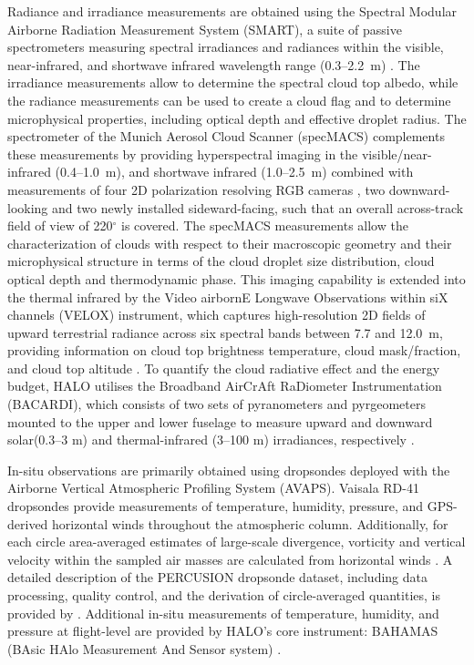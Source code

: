 \documentclass{article}
\begin{document}
Radiance and irradiance measurements are obtained using the Spectral Modular Airborne Radiation Measurement System (SMART), a suite of passive spectrometers measuring spectral irradiances and radiances within the visible, near-infrared, and shortwave infrared wavelength range (0.3--2.2~\textmu m) \citep{wendischAirborneSpectralAlbedometer2001, wendischACRIDICONCHUVACampaign2016}. The irradiance measurements allow to determine the spectral cloud top albedo, while the radiance measurements can be used to create a cloud flag and to determine microphysical properties, including optical depth and effective droplet radius. 
The spectrometer of the Munich Aerosol Cloud Scanner (specMACS) complements these measurements by providing hyperspectral imaging in the visible/near-infrared (0.4--1.0~\textmu m), and shortwave infrared (1.0--2.5~\textmu m) \citep{ewaldDesignCharacterizationSpecMACS2016} combined with measurements of four 2D polarization resolving RGB cameras \citep{Weber2024specMACSPolarization}, two downward-looking and two newly installed sideward-facing, such that an overall across-track field of view of 220$^{\circ}$ is covered.
The specMACS measurements allow the characterization of clouds with respect to their macroscopic geometry and their microphysical structure in terms of the cloud droplet size distribution, cloud optical depth and thermodynamic phase.
This imaging capability is extended into the thermal infrared by the Video airbornE Longwave Observations within siX channels (VELOX) instrument, which captures high-resolution 2D fields of upward terrestrial radiance across six spectral bands between 7.7 and 12.0~\textmu m, providing information on cloud top brightness temperature, cloud mask/fraction, and cloud top altitude \citep{schaferVELOXNewThermal2022}.
To quantify the cloud radiative effect and the energy budget, HALO utilises the Broadband AirCrAft RaDiometer Instrumentation (BACARDI), which consists of two sets of pyranometers and pyrgeometers mounted to the upper and lower fuselage to measure upward and downward solar(0.3--3 \textmu m) and thermal-infrared (3--100 \textmu m) irradiances, respectively \citep{ehrlichNewAirborneBroadband2023}.

In-situ observations are primarily obtained using dropsondes deployed with the Airborne Vertical Atmospheric Profiling System (AVAPS). Vaisala RD-41 dropsondes provide measurements of temperature, humidity, pressure, and GPS-derived horizontal winds throughout the atmospheric column. Additionally, for each circle area-averaged estimates of large-scale divergence, vorticity and vertical velocity within the sampled air masses are calculated from horizontal winds \citep{bonyMeasuringAreaAveragedVertical2019}. 
A detailed description of the PERCUSION dropsonde dataset, including data processing, quality control, and the derivation of circle-averaged quantities, is provided by \cite{gloecknerBEACHBarbadosEastern2025}.
Additional in-situ measurements of temperature, humidity, and pressure at flight-level are provided by HALO's core instrument: BAHAMAS (BAsic HAlo Measurement And Sensor system) \citep{krautstrunkTransitionFALCONHALO2012}. 
\end{document}
